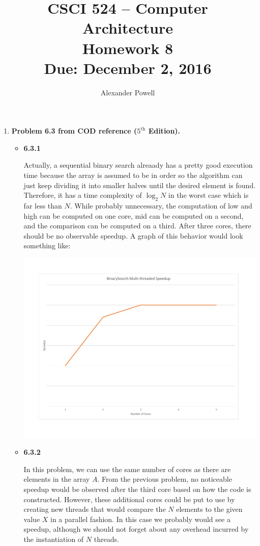 \documentclass[10pt]{article} %
\title{CSCI 524 -- Computer Architecture \\
Homework 8 \\
{\large{\bf Due: December 2, 2016}}}
\date{}
\author{Alexander Powell}
\begin{document}
\maketitle
\begin{enumerate}[1.]
\item %
\textbf{Problem 6.3 from COD reference ($5^{\text{th}}$ Edition).  }

\begin{itemize}

\item
\textbf{6.3.1}

Actually, a sequential binary search alreaady has a pretty good execution time because the array is assumed to be in order so the algorithm can just keep dividing it into smaller halves until the desired element is found.  Therefore, it has a time complexity of $\log_2 N$ in the worst case which is far less than $N$.  While probably unnecessary, the computation of low and high can be computed on one core, mid can be computed on a second, and the comparison can be computed on a third.  After three cores, there should be no observable speedup.  A graph of this behavior would look something like:

\begin{center}
\includegraphics[scale=0.4]{graphs/binarysearch.pdf}
\end{center}

\item
\textbf{6.3.2}

In this problem, we can use the same number of cores as there are elements in the array $A$.  From the previous problem, no noticeable speedup would be observed after the third core based on how the code is constructed.  However, these additional cores could be put to use by creating new threads that would compare the $N$ elements to the given value $X$ in a parallel fashion.  In this case we probably would see a speedup, although we should not forget about any overhead incurred by the instantiation of $N$ threads.  


\end{itemize}
\end{enumerate}
\end{document}
